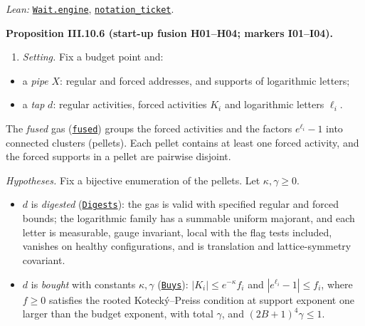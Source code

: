 \documentclass[
  letterpaper,
  11pt]{article}
\providecommand{\tightlist}{%
  \setlength{\itemsep}{0pt}\setlength{\parskip}{0pt}}
\begin{document}
\emph{Lean:}
\href{https://github.com/yang-mills-group/OpenAI-YM-20261028/blob/3456e5e75cf8d4cd558955a5c7638fba2d68f464/YM/PhysicalNext/RG_NEXT_COMPLETE_REPEATABLE_NONLINEAR_STEP/Pane/Divisors.lean\#L26-L135}{\texttt{Wait.engine}},
\href{https://github.com/yang-mills-group/OpenAI-YM-20261028/blob/3456e5e75cf8d4cd558955a5c7638fba2d68f464/YM/Pressure/Seeds.lean\#L166-L181}{\texttt{notation\_ticket}}.

\textbf{Proposition III.10.6 (start-up fusion H01--H04; markers
I01--I04).}

\begin{enumerate}
\def\labelenumi{(\Alph{enumi})}
\setcounter{enumi}{7}
\tightlist
\item
  \emph{Setting.} Fix a budget point and:
\end{enumerate}

\begin{itemize}
\tightlist
\item
  a \emph{pipe} \(X\): regular and forced addresses, and supports of
  logarithmic letters;
\item
  a \emph{tap} \(d\): regular activities, forced activities \(K_i\) and
  logarithmic letters \(\ell_i\).
\end{itemize}

The \emph{fused} gas
(\href{https://github.com/yang-mills-group/OpenAI-YM-20261028/blob/3456e5e75cf8d4cd558955a5c7638fba2d68f464/YM/Ovens/Coffee.lean\#L78}{\texttt{fused}})
groups the forced activities and the factors \(e^{\ell_i}-1\) into
connected clusters (pellets). Each pellet contains at least one forced
activity, and the forced supports in a pellet are pairwise disjoint.

\emph{Hypotheses.} Fix a bijective enumeration of the pellets. Let
\(\kappa,\gamma\ge0\).

\begin{itemize}
\tightlist
\item
  \(d\) is \emph{digested}
  (\href{https://github.com/yang-mills-group/OpenAI-YM-20261028/blob/3456e5e75cf8d4cd558955a5c7638fba2d68f464/YM/Ovens/Coffee.lean\#L81-L90}{\texttt{Digests}}):
  the gas is valid with specified regular and forced bounds; the
  logarithmic family has a summable uniform majorant, and each letter is
  measurable, gauge invariant, local with the flag tests included,
  vanishes on healthy configurations, and is translation and
  lattice-symmetry covariant.
\item
  \(d\) is \emph{bought} with constants \(\kappa,\gamma\)
  (\href{https://github.com/yang-mills-group/OpenAI-YM-20261028/blob/3456e5e75cf8d4cd558955a5c7638fba2d68f464/YM/Ovens/Coffee.lean\#L94-L98}{\texttt{Buys}}):
  \(|K_i|\le e^{-\kappa}f_i\) and \(|e^{\ell_i}-1|\le f_i\), where
  \(f\ge0\) satisfies the rooted Kotecký--Preiss condition at support
  exponent one larger than the budget exponent, with total \(\gamma\),
  and \((2B+1)^4\gamma\le1\).
\end{itemize}
\end{document}
